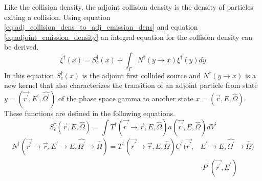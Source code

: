 Like the collision density, the adjoint collision density is the density of
particles exiting a collision. Using equation 
\ref{eq:adj_collision_dens_to_adj_emission_dens} and equation 
\ref{eq:adjoint_emission_density} an integral equation for the collision 
density can be derived.
\begin{equation*}
  \xi^{\dagger}(x) = S_c^{\dagger}(x) + \int_{\Gamma} N^{\dagger}(y \to x)
  \xi^{\dagger}(y) dy
\end{equation*}
In this equation $S_c^{\dagger}(x)$ is the adjoint first collided source and
$N^{\dagger}(y \to x)$ is a new kernel that also characterizes the transition
of an adjoint particle from state $y = (\vec{r^{'}},E^{'},\hat{\Omega^{'}})$ of
the phase space gamma to another state $x = (\vec{r},E,\hat{\Omega})$. These
functions are defined in the following equations.
\begin{equation}
  S_c^{\dagger}(\vec{r},E,\hat{\Omega}) = \int 
  T^{\dagger}(\vec{r^{'}} \to \vec{r},E,\hat{\Omega}) a(\vec{r^{'}},E,\hat{\Omega})
  dV^{'}
\end{equation}
\begin{equation}
  \begin{split}
    N^{\dagger}(\vec{r^{'}} \to \vec{r},E^{'} \to E,\hat{\Omega^{'}} \to \hat{\Omega})
    = T^{\dagger}(\vec{r^{'}} \to \vec{r},E,\hat{\Omega})
    C^{\dagger}(\vec{r^{'}},&E^{'} \to E,\hat{\Omega^{'}} \to \hat{\Omega}) \\
    & \cdot P^{\dagger}(\vec{r^{'}},E^{'}) 
  \end{split}
\end{equation}

